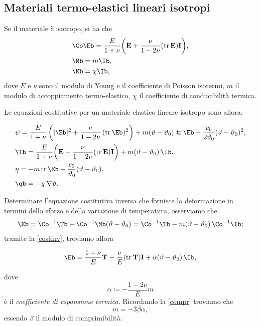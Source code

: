 \subsection{Materiali termo-elastici lineari isotropi}
Se il materiale è isotropo, si ha che
\begin{equation}
\begin{aligned}
&\Co \Eb=\frac{E}{1+\nu}{\left(\mathbf{E}+\frac{\nu}{1-2\nu}(\operatorname{tr}\mathbf{E})\mathbf{I}\right)},\\
&\Mb =m \Ib, \\
&\Kb =\chi \Ib,
\end{aligned}
\end{equation}
dove $E$ e $\nu$ sono il modulo di Young e il coefficiente di Poisson isotermi, $m$ il modulo di accoppiamento termo-elastico, $\chi$ il coefficiente di conducibilità termica. 

Le equazioni costitutive per un materiale elastico lineare isotropo sono allora:
\begin{definition}
\begin{equation}
\begin{aligned}
&\psi=\frac{E}{1+\nu}\left( |\Eb|^2+ \frac{\nu}{1-2\nu}\,(\operatorname{tr}\Eb)^2\right)+ m (\vartheta-\vartheta_0)\, \operatorname{tr}\Eb-\frac{c_0}{2\vartheta_0}(\vartheta-\vartheta_0)^2,\\
&\Tb=\frac{E}{1+\nu}{\left(\mathbf{E}+\frac{\nu}{1-2\nu}(\operatorname{tr}\mathbf{E})\mathbf{I}\right)}+m(\vartheta-\vartheta_0)\,\Ib,\\
&\eta=- m \operatorname{tr}\Eb+\frac{c_0}{\vartheta_0}(\vartheta-\vartheta_0),\\
&\qb=-\chi\, \nabla\vartheta.
\end{aligned}
\end{equation}
\end{definition}

Determinare l'equazione costitutiva inversa che fornisce la deformazione in termini dello sforzo e della variazione di temperatura, osserviamo che
\begin{equation}
\Eb= \Co^{-1}\Tb-\Co^{-1}\Mb(\vartheta-\vartheta_0)= \Co^{-1}\Tb-m(\vartheta-\vartheta_0)\,\Co^{-1}\Ib;
\end{equation}
tramite la \eqref{costinv}, troviamo allora
\begin{definition}
	\begin{equation}\label{constinvthe}
		\Eb=\frac{1+\nu}{E}\mathbf{T}-\frac{\nu}{E}(\operatorname{tr}\mathbf{T})\mathbf{I}+\alpha(\vartheta-\vartheta_0)\,\Ib,
	\end{equation}
\end{definition}
dove
\begin{equation}
\alpha\coloneqq -\frac{1-2\nu}{E}m
\end{equation}
è il \textit{coefficiente di espansione termica}. Ricordando la \eqref{compr} troviamo che 
\begin{equation}
m=-3\beta \alpha,
\end{equation}
essendo $\beta$ il modulo di comprimibilità.






